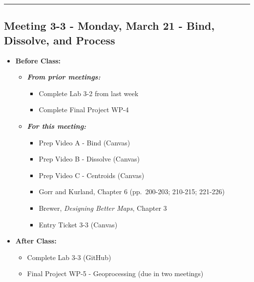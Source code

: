 \documentclass[
]{book}
\providecommand{\tightlist}{%
  \setlength{\itemsep}{0pt}\setlength{\parskip}{0pt}}
\begin{document}
\begin{center}\rule{0.5\linewidth}{0.5pt}\end{center}

\hypertarget{meeting-3-3---monday-march-21---bind-dissolve-and-process}{%
\subsection*{Meeting 3-3 - Monday, March 21 - Bind, Dissolve, and Process}\label{meeting-3-3---monday-march-21---bind-dissolve-and-process}}

\begin{itemize}
\tightlist
\item
  \textbf{Before Class:}

  \begin{itemize}
  \tightlist
  \item
    \textbf{\emph{From prior meetings:}}

    \begin{itemize}
    \tightlist
    \item
      Complete Lab 3-2 from last week
    \item
      Complete Final Project WP-4
    \end{itemize}
  \item
    \textbf{\emph{For this meeting:}}

    \begin{itemize}
    \tightlist
    \item
      Prep Video A - Bind (Canvas)
    \item
      Prep Video B - Dissolve (Canvas)
    \item
      Prep Video C - Centroids (Canvas)
    \item
      Gorr and Kurland, Chapter 6 (pp.~200-203; 210-215; 221-226)
    \item
      Brewer, \emph{Designing Better Maps}, Chapter 3
    \item
      Entry Ticket 3-3 (Canvas)
    \end{itemize}
  \end{itemize}
\item
  \textbf{After Class:}

  \begin{itemize}
  \tightlist
  \item
    Complete Lab 3-3 (GitHub)
  \item
    Final Project WP-5 - Geoprocessing (due in two meetings)
  \end{itemize}
\end{itemize}
\end{document}
